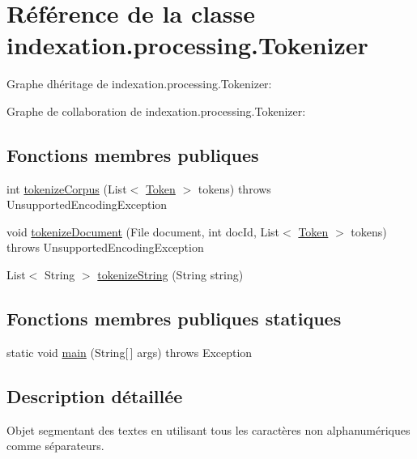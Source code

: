 \hypertarget{classindexation_1_1processing_1_1Tokenizer}{}\section{Référence de la classe indexation.\+processing.\+Tokenizer}
\label{classindexation_1_1processing_1_1Tokenizer}


Graphe d\textquotesingle{}héritage de indexation.\+processing.\+Tokenizer\+:


Graphe de collaboration de indexation.\+processing.\+Tokenizer\+:
\subsection*{Fonctions membres publiques}
\begin{DoxyCompactItemize}
\item 
int \hyperlink{classindexation_1_1processing_1_1Tokenizer_a6efa197da7bf96fe0758c421d23a3a7f}{tokenize\+Corpus} (List$<$ \hyperlink{classindexation_1_1content_1_1Token}{Token} $>$ tokens)  throws Unsupported\+Encoding\+Exception 	
\item 
void \hyperlink{classindexation_1_1processing_1_1Tokenizer_a00533ab9f9ad07d38e17364a4227d5f1}{tokenize\+Document} (File document, int doc\+Id, List$<$ \hyperlink{classindexation_1_1content_1_1Token}{Token} $>$ tokens)  throws Unsupported\+Encoding\+Exception 	
\item 
List$<$ String $>$ \hyperlink{classindexation_1_1processing_1_1Tokenizer_a3987c2977e98439758035b5b9f2c7e89}{tokenize\+String} (String string)
\end{DoxyCompactItemize}
\subsection*{Fonctions membres publiques statiques}
\begin{DoxyCompactItemize}
\item 
static void \hyperlink{classindexation_1_1processing_1_1Tokenizer_ab24de26039cb3c92fc4697f86fc4b0e3}{main} (String\mbox{[}$\,$\mbox{]} args)  throws Exception 	
\end{DoxyCompactItemize}


\subsection{Description détaillée}
Objet segmentant des textes en utilisant tous les caractères non alphanumériques comme séparateurs. 


